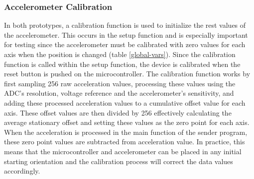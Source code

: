 \subsubsection{Accelerometer Calibration}
In both prototypes, a calibration function is used to initialize the rest values of the accelerometer. This occurs in the setup function and is especially important for testing since the accelerometer must be calibrated with zero values for each axis when the position is changed (table \ref{global-vars}). Since the calibration function is called within the setup function, the device is calibrated when the reset button is pushed on the microcontroller. The calibration function works by first sampling 256 raw acceleration values, processing these values using the ADC's resolution, voltage reference and the accelerometer's sensitivity, and adding these processed acceleration values to a cumulative offset value for each axis. These offset values are then divided by 256 effectively calculating the average stationary offset and setting these values as the zero point for each axis. When the acceleration is processed in the main function of the sender program, these zero point values are subtracted from acceleration value. In practice, this means that the microcontroller and accelerometer can be placed in any initial starting orientation and the calibration process will correct the data values accordingly. 



